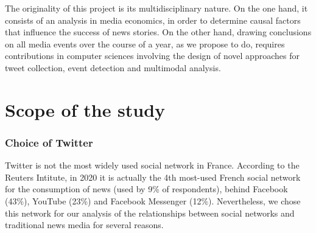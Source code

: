 The originality of this project is its multidisciplinary nature. On the one hand, it consists of an analysis in media economics, in order to determine causal factors that influence the success of news stories. On the other hand, drawing conclusions on all media events over the course of a year, as we propose to do, requires contributions in computer sciences involving the design of novel approaches for tweet collection, event detection and multimodal analysis. 


\section{Scope of the study}
\subsubsection{Choice of Twitter}

	
	Twitter is not the most widely used social network in France. According to the Reuters Intitute, in 2020 it is actually the 4th most-used French social network for the consumption of news (used by 9\% of respondents), behind Facebook (43\%), YouTube (23\%) and Facebook Messenger (12\%). Nevertheless, we chose this network for our analysis of the relationships between social networks and traditional news media for several reasons. 

